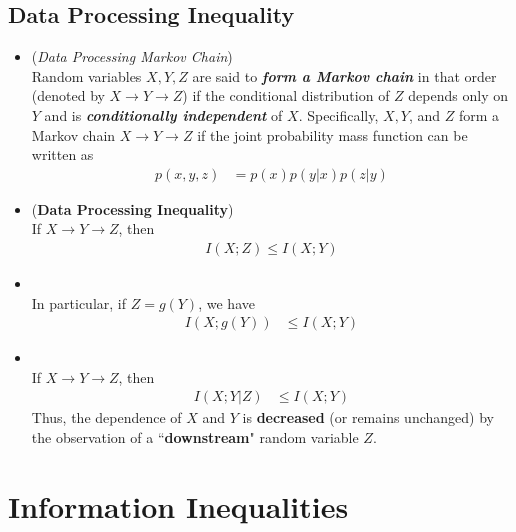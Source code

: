\documentclass[11pt]{article}
\begin{document}
\subsection{Data Processing Inequality}
\begin{itemize}
\item \begin{definition} (\emph{Data Processing Markov Chain})\\
Random variables $X, Y, Z$ are said to \emph{\textbf{form a Markov chain}} in that order (denoted by $X \to Y \to Z$) if the conditional distribution of $Z$ depends only on $Y$ and is \emph{\textbf{conditionally independent}} of $X$. Specifically, $X, Y$, and $Z$ form a Markov chain $X \to Y \to Z$ if the joint probability mass function can be written as
\begin{align*}
p(x, y, z) &= p(x) p(y | x) p(z | y)
\end{align*}
\end{definition}

\item \begin{proposition} (\textbf{Data Processing Inequality})   \citep{thomas2006elements}\\
If $X \to Y \to Z$, then
\begin{align*}
I(X; Z) \le I(X; Y)
\end{align*}
\end{proposition}

\item \begin{corollary}\citep{thomas2006elements}\\
In particular, if $Z = g(Y)$, we have 
\begin{align*}
I(X; g(Y)) &\le I(X; Y)
\end{align*}
\end{corollary}

\item \begin{corollary}\citep{thomas2006elements}\\
If $X \to Y \to Z$, then
\begin{align*}
I(X; Y| Z) &\le I(X; Y)
\end{align*} Thus, the dependence of $X$ and $Y$ is \textbf{decreased} (or remains unchanged) by the observation of a ``\textbf{downstream}" random variable $Z$. 
\end{corollary}
\end{itemize}


\section{Information Inequalities}
\end{document}
